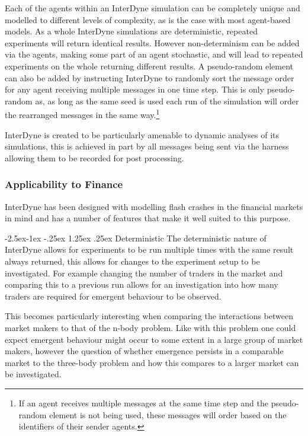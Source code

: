 \documentclass{article}
\makeatletter
\renewcommand\paragraph{\@startsection{paragraph}{4}{\z@}%
	{-2.5ex\@plus -1ex \@minus -.25ex}%
	{1.25ex \@plus .25ex}%
	{\normalfont\normalsize\bfseries}}
\makeatother
\begin{document}
Each of the agents within an InterDyne simulation can be completely unique and modelled to different levels of complexity, as is the case with most agent-based models. As a whole InterDyne simulations are deterministic, repeated experiments will return identical results. However non-determinism can be added via the agents, making some part of an agent stochastic, and will lead to repeated experiments on the whole returning different results. A pseudo-random element can also be added by instructing InterDyne to randomly sort the message order for any agent receiving multiple messages in one time step. This is only pseudo-random as, as long as the same seed is used each run of the simulation will order the rearranged messages in the same way.\footnote{If an agent receives multiple messages at the same time step and the pseudo-random element is not being used, these messages will order based on the identifiers of their sender agents.}

InterDyne is created to be particularly amenable to dynamic analyses of its simulations, this is achieved in part by all messages being sent via the harness allowing them to be recorded for post processing.     


\subsubsection{Applicability to Finance} \label{applicabilut_to_finance}
InterDyne has been designed with modelling flash crashes in the financial markets in mind and has a number of features that make it well suited to this purpose. 

\paragraph{Deterministic}
The deterministic nature of InterDyne allows for experiments to be run multiple times with the same result always returned, this allows for changes to the experiment setup to be investigated. For example changing the number of traders in the market and comparing this to a previous run allows for an investigation into how many traders are required for emergent behaviour to be observed.

This becomes particularly interesting when comparing the interactions between market makers to that of the n-body problem. Like with this problem one could expect emergent behaviour might occur to some extent in a large group of market makers, however the question of whether emergence persists in a comparable market to the three-body problem and how this compares to a larger market can be investigated.   
\end{document}
